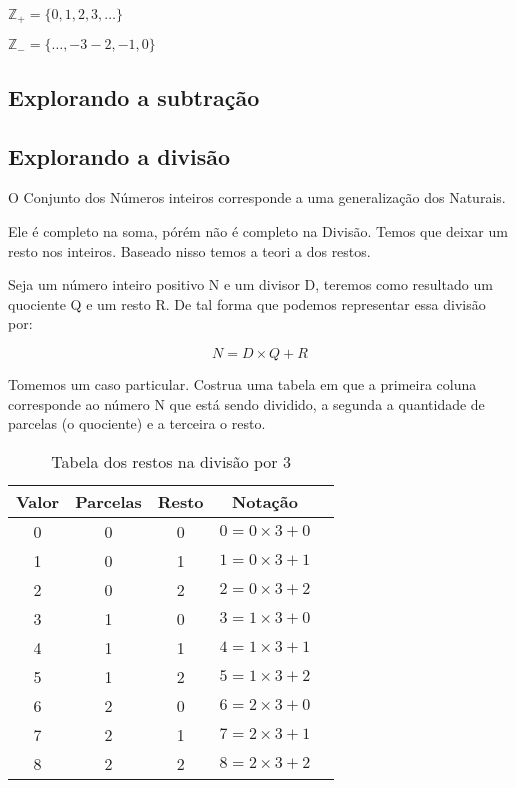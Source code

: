 $\mathbb{Z}_+=\{ 0, 1,2 ,3 , \dots \}$

$\mathbb{Z}_-=\{\dots, -3 -2, -1, 0 \}$

\subsection{Explorando a subtração}




\subsection{Explorando a divisão}
O Conjunto dos Números inteiros corresponde a uma generalização dos Naturais. 

Ele é completo na soma, pórém não é completo na Divisão. Temos que deixar um resto nos inteiros. Baseado nisso temos a teori a dos restos.

Seja um número inteiro positivo N e um divisor D, teremos como resultado um quociente Q e um resto R. De tal forma que podemos representar essa divisão por:

$$N=D\times Q+R$$

Tomemos um caso particular. Costrua uma tabela em que a primeira coluna corresponde ao número N que está sendo dividido, a segunda a quantidade de parcelas (o quociente) e a terceira o resto.

\begin{table}[h]
 \centering
 \begin{tabular}{|c|c|c|c|c|}
 \hline
 Valor & Parcelas & Resto & Notação\\
 \hline
 0 & 0 & 0 & $0=0\times 3 + 0$\\
 \hline
 1 & 0 & 1 & $1=0\times 3 + 1$\\
 \hline
 2 & 0 & 2 & $2=0\times 3 + 2$\\
 \hline
 3 & 1 & 0 & $3=1\times 3 + 0$ \\
 \hline
 4 & 1 & 1 & $4=1\times 3 + 1$\\
 \hline
 5 & 1 & 2 & $5=1\times 3 + 2$\\
 \hline
 6 & 2 & 0 & $6=2\times 3 + 0$\\
 \hline
 7 & 2 & 1 & $7=2\times 3 + 1$\\
 \hline
 8 & 2 & 2 & $8=2\times 3 + 2$\\
 \hline
 \end{tabular}
 \caption{Tabela dos restos na divisão por 3}
 \label{tab:my_label}
\end{table}

